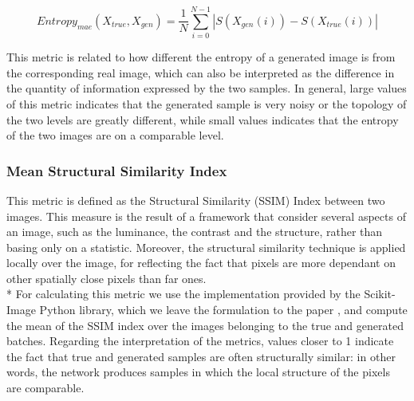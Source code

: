 \begin{equation}
Entropy_{mae}(X_{true}, X_{gen}) = \frac{1}{N}\sum_{i=0}^{N-1} | S(X_{gen}(i)) - S(X_{true}(i)) |
\end{equation}

This metric is related to how different the entropy of a generated image is from the corresponding real image, which can also be interpreted as the difference in the quantity of information expressed by the two samples. In general, large values of this metric indicates that the generated sample is very noisy or the topology of the two levels are greatly different, while small values indicates that the entropy of the two images are on a comparable level. 

\subsubsection{Mean Structural Similarity Index}
This metric is defined as the Structural Similarity (SSIM) Index \cite{ssim} between two images.  This measure is the result of a framework that consider several aspects of an image, such as the luminance, the contrast and the structure, rather than basing only on a statistic. Moreover, the structural similarity technique is applied locally over the image, for reflecting the fact that pixels are more dependant on other spatially close pixels than far ones. \\*
For calculating this metric we use the implementation provided by the Scikit-Image Python library, which we leave the formulation to the paper \cite[p.~604]{ssim}, and compute the mean of the SSIM index over the images belonging to the true and generated batches. Regarding the interpretation of the metrics, values closer to 1 indicate the fact that true and generated samples are often structurally similar: in other words, the network produces samples in which the local structure of the pixels are comparable.

